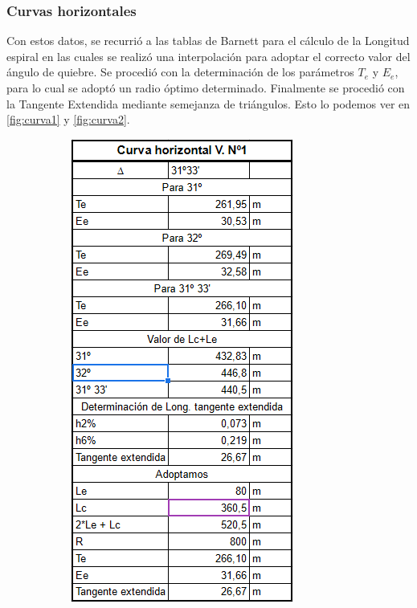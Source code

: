 \documentclass[../main.tex]{subfiles}
\begin{document}
\subsubsection{Curvas horizontales}
Con estos datos, se recurrió a las tablas de Barnett para el cálculo de la Longitud espiral en las cuales se realizó una interpolación para adoptar el correcto valor del ángulo de quiebre. Se procedió con la determinación de los parámetros $T_e$ y $E_e$, para lo cual se adoptó un radio óptimo determinado. Finalmente se procedió con la Tangente Extendida mediante semejanza de triángulos. Esto lo podemos ver en \cref{fig:curva1} y \cref{fig:curva2}.

\begin{figure}[ht]
\centering
\begin{subfigure}{.5\textwidth}
  \centering
  \includegraphics[width=0.85\linewidth]{images/google_sheets/Screenshot_3.png}

\end{subfigure}
\end{figure}
\end{document}

